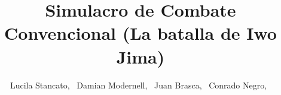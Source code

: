 \documentclass[10pt,journal,compsoc]{IEEEtran}
\begin{document}
%
\title{Simulacro de Combate Convencional (La batalla de Iwo Jima)}
%
%
%
%

\author{Lucila Stancato,~
        Damian Modernell,~
	Juan Brasca,~
        Conrado Negro,~%
}
\end{document}
